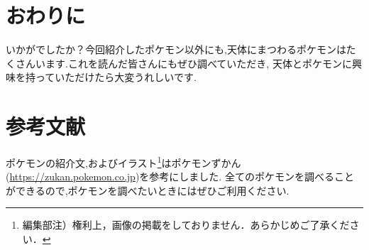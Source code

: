 \documentclass[supernova_2023]{subfiles}
\begin{document}
\section{おわりに}
いかがでしたか？今回紹介したポケモン以外にも,天体にまつわるポケモンはたくさんいます.これを読んだ皆さんにもぜひ調べていただき,
天体とポケモンに興味を持っていただけたら大変うれしいです.
\section{参考文献}
ポケモンの紹介文,およびイラスト\footnote{編集部注）権利上，画像の掲載をしておりません．あらかじめご了承ください．}はポケモンずかん(\url{https://zukan.pokemon.co.jp})を参考にしました.
全てのポケモンを調べることができるので,ポケモンを調べたいときにはぜひご利用ください.
\end{document}
